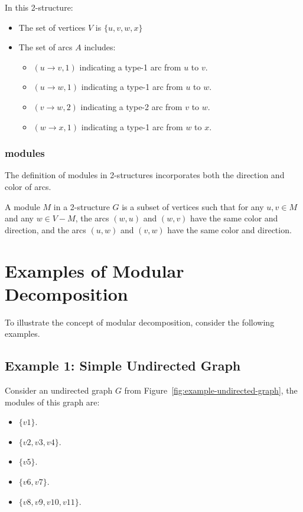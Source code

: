 In this 2-structure:
\begin{itemize}
    \item The set of vertices $V$ is $\{u, v, w, x\}$
    \item The set of arcs $A$ includes:
    \begin{itemize}
        \item $(u \rightarrow v, 1)$ indicating a type-1 arc from $u$ to $v$.
        \item $(u \rightarrow w, 1)$ indicating a type-1 arc from $u$ to $w$.
        \item $(v \rightarrow w, 2)$ indicating a type-2 arc from $v$ to $w$.
        \item $(w \rightarrow x, 1)$ indicating a type-1 arc from $w$ to $x$.
    \end{itemize}
\end{itemize}

\subsubsection{modules}

The definition of modules in 2-structures incorporates both the direction and color of arcs.

\begin{mydef}
    A module $M$ in a 2-structure $G$ is a subset of vertices such that for any $u, v \in M$ and any $w \in V - M$, the arcs $(w, u)$ and $(w, v)$ have the same color and direction, and the arcs $(u, w)$ and $(v, w)$ have the same color and direction.
\end{mydef}


\section{Examples of Modular Decomposition}\label{sec:examples-of-modular-decomposition}

To illustrate the concept of modular decomposition, consider the following examples.

\subsection*{Example 1: Simple Undirected Graph}\label{subsec:example-1:-simple-undirected-graph}

Consider an undirected graph $G$ from Figure~\ref{fig:example-undirected-graph}, the modules of this graph are:

\begin{itemize}
    \item $\{v1\}$.
    \item $\{v2, v3, v4\}$.
    \item $\{v5\}$.
    \item $\{v6, v7\}$.
    \item $\{v8, v9, v10, v11\}$.
\end{itemize}

